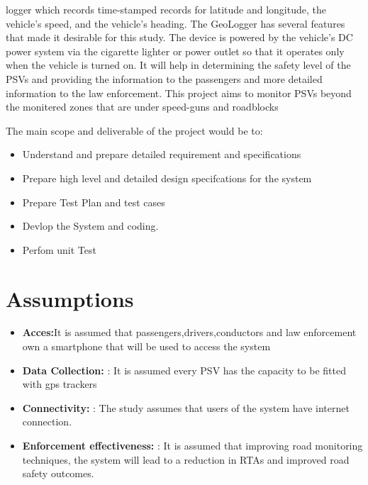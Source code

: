 \documentclass[a4paper, 12pt]{report}
\begin{document}
logger which records time-stamped records for latitude and longitude, the vehicle's
speed, and the vehicle's heading. The GeoLogger has several features that made
it desirable for this study. The device is powered by the vehicle's DC power
system via the cigarette lighter or power outlet so that it operates only when the
vehicle is turned on. It will help in determining the safety level of the PSVs and
providing the information to the passengers and more detailed information to the
law enforcement. This project aims to monitor PSVs beyond the monitered zones
that are under speed-guns and roadblocks\par 
\noindent The main scope and deliverable of the project would be to:
\begin{itemize}
\item Understand and prepare detailed requirement and specifications
\item Prepare high level and detailed design specifcations for the system
\item Prepare Test Plan and test cases
\item Devlop the System and coding.
\item Perfom unit Test

\end{itemize}

\section{Assumptions}
\begin{itemize}
\item \textbf{Acces:}It is assumed that passengers,drivers,conductors and law enforcement own a smartphone that will be used to access the system

\item \textbf{Data Collection: }: It is assumed every PSV has the capacity to be fitted
with gps trackers
\item \textbf{Connectivity: }: The study assumes that users of the system have internet
connection.
\item \textbf{Enforcement effectiveness:} : It is assumed that improving road monitoring techniques, the system will lead to a reduction in RTAs and improved
road safety outcomes.
\end{itemize}
\end{document}
